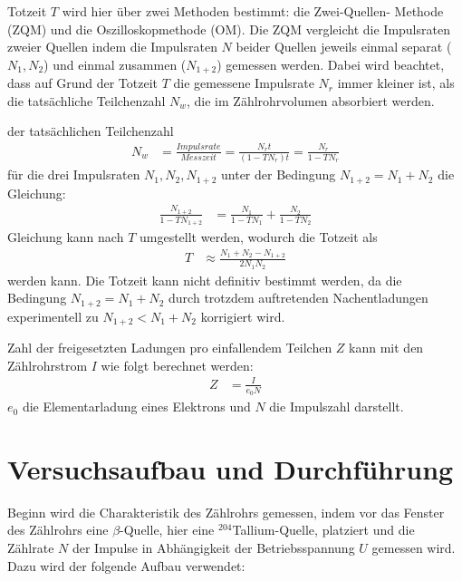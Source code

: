     \justifying Totzeit $T$ wird hier über zwei Methoden bestimmt: die Zwei-Quellen-
    Methode (ZQM) und die Oszilloskopmethode (OM). Die ZQM vergleicht die Impulsraten zweier Quellen
    indem die Impulsraten $N$ beider Quellen jeweils einmal separat ($N_1, N_2$) und einmal zusammen 
    ($N_{1+2}$) gemessen werden. Dabei wird beachtet, dass auf Grund der Totzeit $T$ die gemessene 
    Impulsrate $N_r$ immer kleiner ist, als die tatsächliche Teilchenzahl $N_w$, die im Zählrohrvolumen 
    absorbiert werden.

    \newpage
    \justifying der tatsächlichen Teilchenzahl \cite{V703}
    \begin{align}
        N_w &= \frac{Impulsrate}{Messzeit} = \frac{N_r t}{(1-TN_r)t} = \frac{N_r}{1-TN_r} \label{eq:1}
    \end{align}
    \justifying für die drei Impulsraten $N_1,N_2,N_{1+2}$ unter der Bedingung
    $N_{1+2} = N_1+N_2$ die Gleichung:
    \begin{align}
        \frac{N_{1+2}}{1-TN_{1+2}} &= \frac{N_1}{1-TN_1}+\frac{N_2}{1-TN_2} \label{eq:2}
    \end{align}
    \justifying Gleichung kann nach $T$ umgestellt werden, wodurch die Totzeit als
    \begin{align}
        T &\approx \frac{N_1+N_2-N_{1+2}}{2N_1N_2} \label{eq:3}
    \end{align}
    \justifying werden kann. Die Totzeit kann nicht definitiv bestimmt werden,
    da die Bedingung $N_{1+2} = N_1+N_2$ durch trotzdem auftretenden Nachentladungen experimentell zu $N_{1+2} < N_1+N_2$ korrigiert wird. 

    \justifying Zahl der freigesetzten Ladungen pro einfallendem Teilchen $Z$ kann mit den 
    Zählrohrstrom $I$ wie folgt berechnet werden: \cite{V703}
    \begin{align}
        Z &= \frac{I}{e_0 N} \label{eq:5}
    \end{align}
    \justifying $e_0$ die Elementarladung eines Elektrons und $N$ die Impulszahl darstellt.

\newpage
\section{Versuchsaufbau und Durchführung}

    \justifying Beginn wird die Charakteristik des Zählrohrs gemessen, indem vor das Fenster des Zählrohrs eine $\beta$-Quelle,
    hier eine $^{204}$Tallium-Quelle, platziert und die Zählrate $N$ der Impulse in Abhängigkeit der Betriebsspannung $U$ gemessen wird. Dazu 
    wird der folgende Aufbau verwendet:

